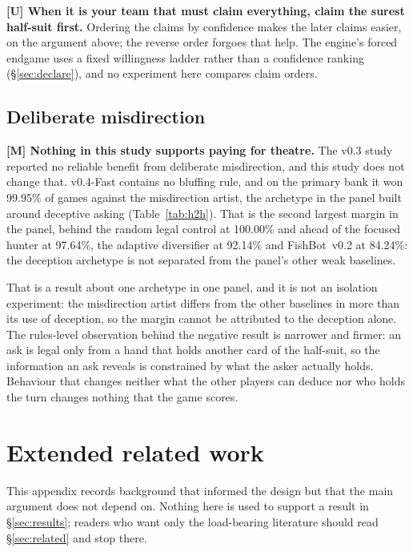 \documentclass[11pt]{article}
\theoremstyle{definition}
\DeclareRobustCommand{\vfast}{\texorpdfstring{\mbox{v0.4-Fast}}{v0.4-Fast}}
\DeclareRobustCommand{\vtwo}{\texorpdfstring{\mbox{FishBot v0.2}}{FishBot v0.2}}
\newcommand{\numVsVtwo}{84.24}
\newcommand{\numVsDiversifier}{92.14}
\newcommand{\numVsHunter}{97.64}
\newcommand{\numVsBluffer}{99.95}
\newcommand{\numVsRandom}{100.00}
\begin{document}
\textbf{[U] When it is your team that must claim everything, claim the surest
half-suit first.} Ordering the claims by confidence makes the later claims
easier, on the argument above; the reverse order forgoes that help. The
engine's forced endgame uses a fixed willingness ladder rather than a confidence
ranking (\S\ref{sec:declare}), and no experiment here compares claim orders.

\subsection{Deliberate misdirection}
\label{app:human-bluff}

\textbf{[M] Nothing in this study supports paying for theatre.} The
v0.3 study reported no reliable benefit from deliberate misdirection, and this
study does not change that. \vfast{} contains no bluffing rule, and on the
primary bank it won \numVsBluffer\% of games against the misdirection artist,
the archetype in the panel built around deceptive asking
(Table~\ref{tab:h2h}). That is the second largest margin in the panel, behind
the random legal control at \numVsRandom\% and ahead of the focused hunter at
\numVsHunter\%, the adaptive diversifier at \numVsDiversifier\% and \vtwo{} at
\numVsVtwo\%: the deception archetype is not separated from the panel's other
weak baselines.

That is a result about one archetype in one panel, and it is not an isolation
experiment: the misdirection artist differs from the other baselines in more
than its use of deception, so the margin cannot be attributed to the deception
alone. The rules-level observation behind the negative result is narrower and
firmer: an ask is legal only from a hand that holds another card of the
half-suit, so the information an ask reveals is constrained by what the asker
actually holds. Behaviour that changes neither what the other players can deduce
nor who holds the turn changes nothing that the game scores.
\section{Extended related work}
\label{app:related}

This appendix records background that informed the design but that the main
argument does not depend on. Nothing here is used to support a result in
\S\ref{sec:results}; readers who want only the load-bearing literature should
read \S\ref{sec:related} and stop there.
\end{document}

